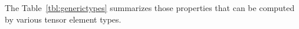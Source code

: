 \documentclass[onefignum, onetabnum]{siamart190516}
\newcommand{\<}{\langle}
\renewcommand{\>}{\rangle}
\newcommand{\Eq}[1]{Eq.~(\ref{#1})}
\begin{document}
The Table~\ref{tbl:generictypes} summarizes those properties that can be computed by various tensor element types.
\end{document}
